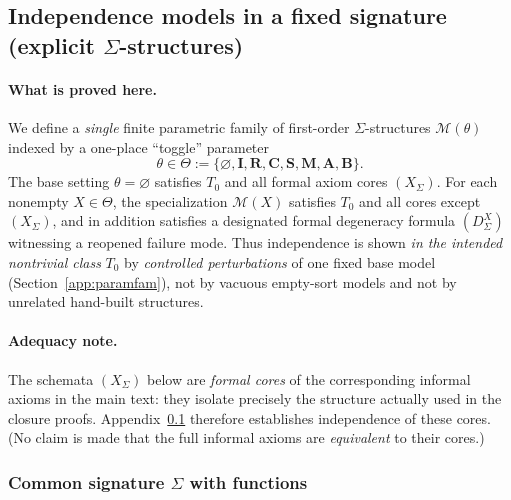 \documentclass[12pt]{article}
\begin{document}
\subsection{Independence models in a fixed signature (explicit \texorpdfstring{$\Sigma$}{Sigma}-structures)}
\label{app:indep}

\paragraph{What is proved here.}
We define a \emph{single} finite parametric family of first-order $\Sigma$-structures $\mathcal{M}(\theta)$ indexed by a one-place ``toggle'' parameter
\[
\theta\in \Theta:=\{\varnothing,\mathbf{I},\mathbf{R},\mathbf{C},\mathbf{S},\mathbf{M},\mathbf{A},\mathbf{B}\}.
\]
The base setting $\theta=\varnothing$ satisfies $T_0$ and all formal axiom cores $(X_\Sigma)$.
For each nonempty $X\in\Theta$, the specialization $\mathcal{M}(X)$ satisfies $T_0$ and all cores except $(X_\Sigma)$, and in addition satisfies a designated
formal degeneracy formula $(D^X_\Sigma)$ witnessing a reopened failure mode.
Thus independence is shown \emph{in the intended nontrivial class} $T_0$ by \emph{controlled perturbations} of one fixed base model (Section~\ref{app:paramfam}),
not by vacuous empty-sort models and not by unrelated hand-built structures.

\paragraph{Adequacy note.}
The schemata $(X_\Sigma)$ below are \emph{formal cores} of the corresponding informal axioms in the main text: they isolate precisely the structure actually used in the closure proofs.
Appendix~\ref{app:indep} therefore establishes independence of these cores. (No claim is made that the full informal axioms are \emph{equivalent} to their cores.)

\subsubsection{Common signature \texorpdfstring{$\Sigma$}{Sigma} with functions}
\end{document}
